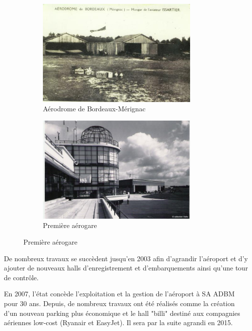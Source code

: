\begin{figure}[hbt!]
    \begin{subfigure}{0.5\textwidth}
      \centering
      \includegraphics[width=8cm]{Images/premier.jpg}  
      \caption{Aérodrome de Bordeaux-Mérignac}
      \label{fig:aérodrome}
    \end{subfigure}
    \begin{subfigure}{0.5\textwidth}
      \centering
      \includegraphics[width=8cm]{Images/premiere_aerogare.jpg}  
      \caption{Première aérogare}
      \label{fig:premiereAerogare}
    \end{subfigure}
\end{figure}


\newpage
De nombreux travaux se succèdent jusqu'en 2003 afin d'agrandir l'aéroport et d'y ajouter de nouveaux halls d'enregistrement et d'embarquements ainsi qu'une tour de contrôle.

En 2007, l'état concède l'exploitation et la gestion de l'aéroport à SA ADBM pour 30 ans. Depuis, de nombreux travaux ont été réalisés comme la création d'un nouveau parking plus économique et le hall "billi" destiné aux compagnies aériennes low-cost (Ryanair et EasyJet). Il sera par la suite agrandi en 2015.\newline

